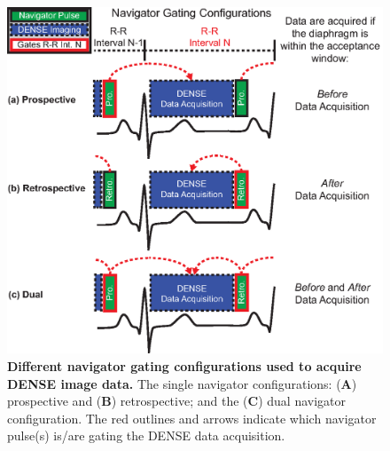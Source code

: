 	\begin{figure} 
		\includegraphics{figures/navpaper/Fig1}
		\caption[Different navigator gating configurations used to acquire DENSE image data]{\textbf{Different navigator gating configurations used to acquire DENSE image data.} The single navigator configurations: (\textbf{A}) prospective and (\textbf{B}) retrospective; and the (\textbf{C}) dual navigator configuration. The red outlines and arrows indicate which navigator pulse(s) is/are gating the DENSE data acquisition.}
		\label{fig:navigator_configurations}
	\end{figure}
	
